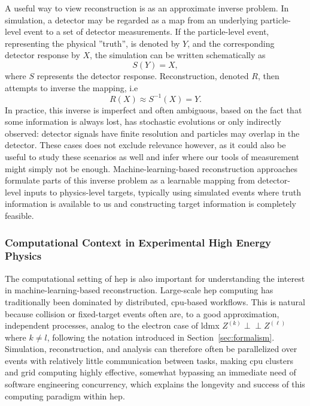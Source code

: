 A useful way to view reconstruction is as an approximate inverse problem. In simulation, a detector may be regarded as a map from an underlying particle-level event to a set of detector measurements. If the particle-level event, representing the physical ''truth'', is denoted by \(Y\), and the corresponding detector response by \(X\), the simulation can be written schematically as
\begin{equation}
    S(Y) = X ,
\end{equation}
where \(S\) represents the detector response. Reconstruction, denoted $R$,  then attempts to inverse the mapping, i.e
\begin{equation}
    R(X) \approx S^{-1}(X) = Y .
\end{equation}
In practice, this inverse is imperfect and often ambiguous, based on the fact that some information is always lost, has stochastic evolutions or only indirectly observed: detector signals have finite resolution and particles may overlap in the detector. These cases does not exclude relevance however, as it could also be useful to study these scenarios as well and infer where our tools of measurement might simply not be enough. Machine-learning-based reconstruction approaches formulate parts of this inverse problem as a learnable mapping from detector-level inputs to physics-level targets, typically using simulated events where truth information is available to us and constructing target information is completely feasible.

\subsubsection{Computational Context in Experimental High Energy Physics}

The computational setting of \gls{hep} is also important for understanding the interest in machine-learning-based reconstruction. Large-scale \gls{hep} computing has traditionally been dominated by distributed, \gls{cpu}-based workflows. \cite{sur2026-heterogeneous-computing} This is natural because collision or fixed-target events often are, to a good approximation, independent processes, analog to the electron case of \gls{ldmx} $Z^{(k)} \perp\!\!\!\perp Z^{(\ell)}$ where $k \neq l$, following the notation introduced in Section~\ref{sec:formalism}. Simulation, reconstruction, and analysis can therefore often be parallelized over events with relatively little communication between tasks, making \gls{cpu} clusters and grid computing highly effective, somewhat bypassing an immediate need of software engineering concurrency, which explains the longevity and success of this computing paradigm within \gls{hep}.

